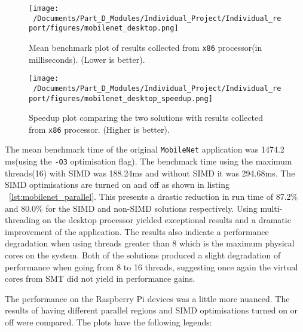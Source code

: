 \begin{figure}[htbp] %
	\centering
	\texttt{[image: ~/Documents/Part\_D\_Modules/Individual\_Project/Individual\_report/figures/mobilenet\_desktop.png]} %
	\caption{Mean benchmark plot of results collected from \texttt{x86} processor(in milliseconds). (Lower is better).}
	\label{fig:mobilenet_desktop_plot} %
\end{figure}

\begin{figure}[H] %
	\centering
	\texttt{[image: ~/Documents/Part\_D\_Modules/Individual\_Project/Individual\_report/figures/mobilenet\_desktop\_speedup.png]} %
	\caption{Speedup plot comparing the two solutions with results collected from \texttt{x86} processor. (Higher is better).}
	\label{fig:mobilenet_desktop_speedup} %
\end{figure}

The mean benchmark time of the original \texttt{MobileNet} application\cite{mobilenet_repo} was 1474.2 ms(using the \texttt{-O3} optimisation flag). The benchmark time using the maximum threads(16) with SIMD was 188.24ms and without SIMD it was 294.68ms. The SIMD optimisations are turned on and off as shown in listing  ~\ref{lst:mobilenet_parallel}. This presents a drastic reduction in run time of 87.2\% and 80.0\% for the SIMD and non-SIMD solutions respectively. Using multi-threading on the desktop processor yielded exceptional results and a dramatic improvement of the application. The results also indicate a performance degradation when using threads greater than 8 which is the maximum physical cores on the system. Both of the solutions produced a slight degradation of performance when going from 8 to 16 threads, suggesting once again the virtual cores from SMT did not yield in performance gains. 

The performance on the Raspberry Pi devices was a little more nuanced. The results of having different parallel regions and SIMD optimisations turned on or off were compared. The plots have the following legends:

